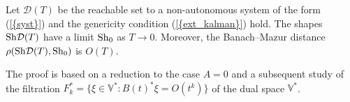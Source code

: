 \documentclass[final]{siamltex}
\begin{document}
\begin{theorem}\label{thmain2} \iffalse Assume that {\rm {(\ref{{syst}})}} is a non-autonomous system such that $U$ is
central symmetric, and the genericity condition {\rm {(\ref{{ext_kalman}})}} holds. Then, the \fi Let
$\mathcal{D}(T)$ be the reachable set to a non-autonomous system of the form {\rm {(\ref{{syst}})}} and
the genericity condition {\rm {(\ref{{ext_kalman}})}} hold. The shapes ${\mathop{\rm Sh}\nolimits}{\cal D} (T)$ have a limit
${\mathop{\rm Sh}\nolimits}_0 $ as $T\to0$. Moreover, the Banach--Mazur distance $\rho({\mathop{\rm Sh}\nolimits}{\cal D} (T),{\mathop{\rm Sh}\nolimits}_0 )$ is
$O({T}).$
\end{theorem}

The proof is based on a reduction to the case $A=0$ and a subsequent study of
the filtration $F_k^*=\{\xi \in \mathbb{V}^*:{ B(t)}^*\xi=O(t^k)\}$ of the dual
space $\mathbb{V}^*$.

\iffalse
\end{document}
